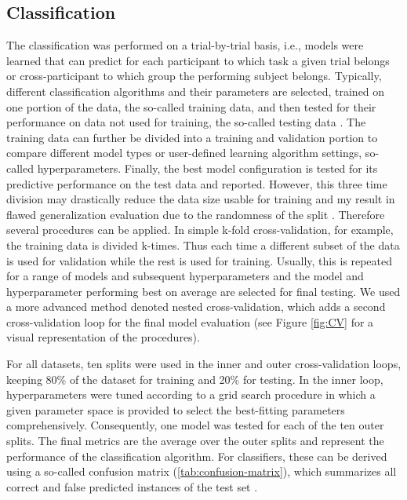 \subsection{Classification}
The classification was performed on a trial-by-trial basis, i.e., models were learned that can predict for each participant to which task a given trial belongs or cross-participant to which group the performing subject belongs. Typically, different classification algorithms and their parameters are selected, trained on one portion of the data, the so-called training data, and then tested for their performance on data not used for training, the so-called testing data \cite{Daumé2017}. The training data can further be divided into a training and validation portion to compare different model types or user-defined learning algorithm settings, so-called hyperparameters. Finally, the best model configuration is tested for its predictive performance on the test data and reported. However, this three time division may drastically reduce the data size usable for training and my result in flawed generalization evaluation due to the randomness of the split \cite{VAROQUAUX2017166}. Therefore several procedures can be applied. In simple k-fold cross-validation, for example, the training data is divided k-times. Thus each time a different subset of the data is used for validation while the rest is used for training. Usually, this is repeated for a range of models and subsequent hyperparameters and the model and hyperparameter performing best on average are selected for final testing. We used a more advanced method denoted nested cross-validation, which adds a second cross-validation loop for the final model evaluation (see Figure \ref{fig:CV} for a visual representation of the procedures).

\begin{figure*}[h]
\centering
   
  \caption[Nested cross-validation procedure]{Nested cross-validation procedure. CV: cross-validation, Val: Validation}
  \label{fig:CV}
\end{figure*}

\noindent For all datasets, ten splits were used in the inner and outer cross-validation loops, keeping 80\% of the dataset for training and 20\% for testing. In the inner loop, hyperparameters were tuned according to a grid search procedure in which a given parameter space is provided to select the best-fitting parameters \cite{VAROQUAUX2017166} comprehensively. Consequently, one model was tested for each of the ten outer splits. The final metrics are the average over the outer splits and represent the performance of the classification algorithm. For classifiers, these can be derived using a so-called confusion matrix (\autoref{tab:confusion-matrix}), which summarizes all correct and false predicted instances of the test set \cite{Fawcett2006}.  

